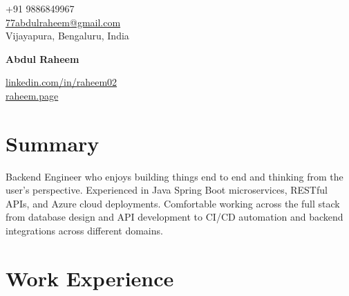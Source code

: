 \documentclass[10pt, a4paper]{article}
\begin{document}
\noindent
\begin{minipage}[t]{0.35\textwidth}
    +91 9886849967 \\
    \href{mailto:77abdulraheem@gmail.com}{77abdulraheem@gmail.com} \\
    Vijayapura, Bengaluru, India
\end{minipage}%
\begin{minipage}[t]{0.30\textwidth}
    \centering
    {\LARGE\bfseries Abdul Raheem}
\end{minipage}%
\begin{minipage}[t]{0.35\textwidth}
    \raggedleft
    \href{https://www.linkedin.com/in/raheem02/}{linkedin.com/in/raheem02} \\
    \href{https://raheem.page/}{raheem.page}
\end{minipage}

\vspace{2pt}

\section{Summary}

Backend Engineer who enjoys building things end to end and thinking from the user's perspective. Experienced in Java Spring Boot microservices, RESTful APIs, and Azure cloud deployments. Comfortable working across the full stack from database design and API development to CI/CD automation and backend integrations across different domains.

\section{Work Experience}
\end{document}
